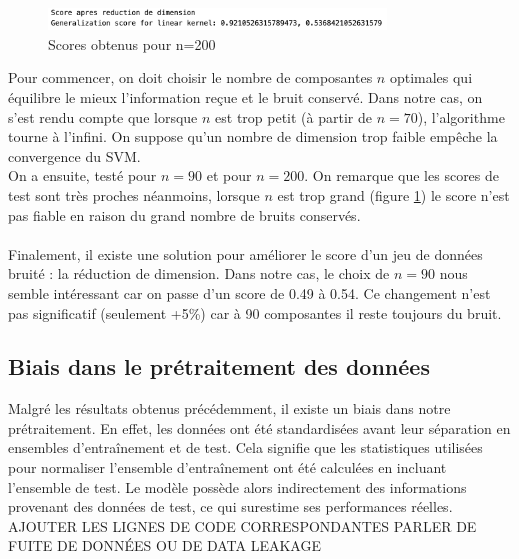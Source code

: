 \documentclass[a4paper,12pt]{article}
\begin{document}
\begin{figure}[H]
    \centering
    \includegraphics[width=0.8\textwidth]{Images/n=200.png}
    \caption{Scores obtenus pour n=200}\label{fig : dim2}
\end{figure}

Pour commencer, on doit choisir le nombre de composantes $n$ optimales qui équilibre le mieux l'information reçue et le bruit conservé.
Dans notre cas, on s'est rendu compte que lorsque $n$ est trop petit (à partir de $n = 70$), l'algorithme tourne à l'infini. On suppose qu'un  nombre de dimension trop faible empêche la convergence du SVM.\\
On a ensuite, testé pour $n = 90$ et pour $n = 200$. On remarque que les scores de test sont très proches néanmoins, lorsque $n$ est trop grand (figure \ref{fig : dim2}) le score n'est pas fiable en raison du grand nombre de bruits conservés.\\
\\
Finalement, il existe une solution pour améliorer le score d'un jeu de données bruité : la réduction de dimension. Dans notre cas, le choix de $n = 90$ nous semble intéressant car on passe d'un score de 0.49 à 0.54.
Ce changement n'est pas significatif (seulement +5\%) car à 90 composantes il reste toujours du bruit.

\subsection{Biais dans le prétraitement des données}

Malgré les résultats obtenus précédemment, il existe un biais dans notre prétraitement. 
En effet, les données ont été standardisées avant leur séparation en ensembles d'entraînement et de test.
Cela signifie que les statistiques utilisées pour normaliser l'ensemble d'entraînement ont été calculées en incluant l'ensemble de test. 
Le modèle possède alors indirectement des informations provenant des données de test, ce qui surestime ses performances réelles.
\\
AJOUTER LES LIGNES DE CODE CORRESPONDANTES
PARLER DE FUITE DE DONNÉES OU DE DATA LEAKAGE
\end{document}
